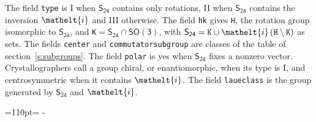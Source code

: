 \documentclass[10pt,a4paper]{article}
\makeatletter
\def\grouprule#1#2{\noalign{\marks\LTgroupmarks{\the\belowrulesep}\nobreak\vskip#1%
  \vskip\aboverulesep}\multispan\LT@cols\unskip{\leaders\hrule\@height#2\hfill\kern\z@}\cr
  \noalign{\penalty\LTrulebreak\vskip\belowrulesep\global\@lastruleclass\z@}}
\newcommand{\needspace}[1]{\par\penalty-100\begingroup\dimen0=#1\relax\dimen2=\pagegoal
  \advance\dimen2-\pagetotal\ifdim\dimen0>\dimen2\relax\ifdim\dimen2>0pt\vfil\break\fi\fi
  \endgroup}
\numberwithin{equation}{section}
\newcommand{\eltfont}[1]{{\let\sigma\eltsigma\mathelt{#1}}}
\newcommand{\grp}[1]{\mathsf{#1}}
\newcommand{\elt}[1]{\eltfont{#1}}
\newcommand{\hmname}[1]{#1}
\newcommand{\orbname}[1]{#1}
\newcommand{\conwayname}[1]{#1}
\newcommand{\igname}[1]{#1}
\newcommand{\olivename}[1]{#1}
\makeatother
\begin{document}
{}
\leavevmode\label{n:element.inversion}The field \texttt{type} is I when $\grp{S_{24}}$ contains only rotations, II when $\grp{S_{24}}$ contains the inversion $\elt{i}$ and III otherwise. The field \texttt{hk} gives \texttt{H}, the rotation group isomorphic to $\grp{S_{24}}$, and \texttt{K}${} = \grp{S_{24}} \cap \grp{SO(3)}$, with $\grp{S_{24}} = \texttt{K} \cup \elt{i}\,(\texttt{H} \setminus \texttt{K})$ as sets. The fields \texttt{center} and \texttt{commutatorsubgroup} are classes of the table of section~\ref{s:subgroups}. The field \texttt{polar} is yes when $\grp{S_{24}}$ fixes a nonzero vector. Crystallographers call a group chiral, or enantiomorphic, when its type is I, and centrosymmetric when it contains $\elt{i}$. The field \texttt{laueclass} is the group generated by $\grp{S_{24}}$ and $\elt{i}$.
\needspace{110pt}
\end{document}
